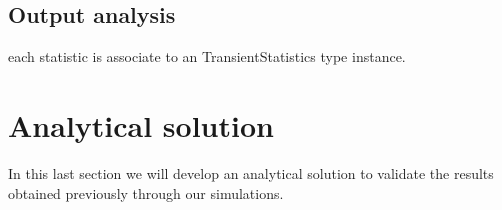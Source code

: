 \documentclass[10pt,a4paper]{article}
\begin{document}
\subsection{Output analysis}

each statistic is associate to an TransientStatistics type instance.























\newpage
\section{Analytical solution}

In this last section we will develop an analytical solution to validate the results obtained previously through our simulations. 
\end{document}

